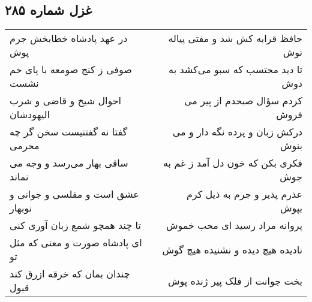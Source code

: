 \begin{center}
\section*{غزل شماره ۲۸۵}
\label{sec:sh285}
\begin{longtable}{l p{0.5cm} r}
در عهد پادشاه خطابخش جرم پوش
&&
حافظ قرابه کش شد و مفتی پیاله نوش
\\
صوفی ز کنج صومعه با پای خم نشست
&&
تا دید محتسب که سبو می‌کشد به دوش
\\
احوال شیخ و قاضی و شرب الیهودشان
&&
کردم سؤال صبحدم از پیر می فروش
\\
گفتا نه گفتنیست سخن گر چه محرمی
&&
درکش زبان و پرده نگه دار و می بنوش
\\
ساقی بهار می‌رسد و وجه می نماند
&&
فکری بکن که خون دل آمد ز غم به جوش
\\
عشق است و مفلسی و جوانی و نوبهار
&&
عذرم پذیر و جرم به ذیل کرم بپوش
\\
تا چند همچو شمع زبان آوری کنی
&&
پروانه مراد رسید ای محب خموش
\\
ای پادشاه صورت و معنی که مثل تو
&&
نادیده هیچ دیده و نشنیده هیچ گوش
\\
چندان بمان که خرقه ازرق کند قبول
&&
بخت جوانت از فلک پیر ژنده پوش
\\
\end{longtable}
\end{center}
